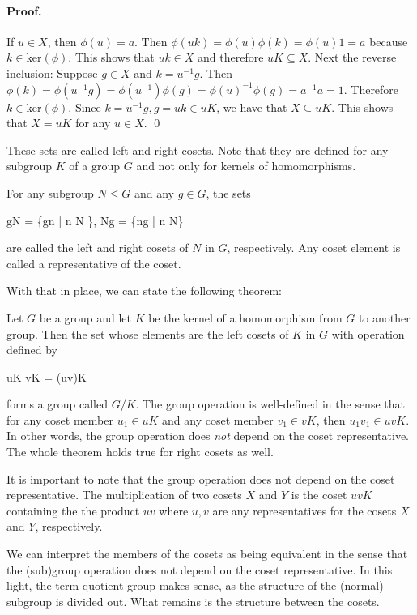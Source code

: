 \paragraph{Proof.} If $u \in X$, then $\phi(u) = a$. Then $\phi(uk) = \phi(u) \phi(k) = \phi(u) 1 = a$ because $k \in \text{ker}(\phi)$. This shows that $uk \in X$ and therefore $uK \subseteq X$. Next the reverse inclusion: Suppose $g \in X$ and $k = u^{-1}g$. Then $\phi(k) = \phi(u^{-1}g) = \phi(u^{-1}) \phi(g) = \phi(u)^{-1} \phi(g) = a^{-1}a = 1$. Therefore $k \in \text{ker}(\phi)$. Since $k=u^{-1}g, g = uk \in uK$, we have that $X \subseteq uK$. This shows that $X = uK$ for any $u \in X$. \qed

These sets are called left and right cosets. Note that they are defined for any subgroup $K$ of a group $G$ and not only for kernels of homomorphisms.

\begin{definition}[Cosets]
For any subgroup $N \leq G$ and any $g \in G$, the sets

\bee
gN = \{gn | n \in N \}, \quad Ng = \{ng | n  \in N\}
\eee

are called the left and right cosets of $N$ in $G$, respectively. Any coset element is called a representative of the coset.
\end{definition}

With that in place, we can state the following theorem: 

\begin{theorem}
Let $G$ be a group and let $K$ be the kernel of a homomorphism from $G$ to another group. Then the set whose elements are the left cosets of $K$ in $G$ with operation defined by

\bee
uK vK = (uv)K
\eee

forms a group called $G/K$. The group operation is well-defined in the sense that for any coset member $u_1 \in uK$ and any coset member $v_1 \in vK$, then $u_1 v_1 \in uvK$. In other words, the group operation does \emph{not} depend on the coset representative. The whole theorem holds true for right cosets as well.
\end{theorem}

It is important to note that the group operation does not depend on the coset representative. The multiplication of two cosets $X$ and $Y$ is the coset $uvK$ containing the the product $uv$ where $u,v$ are any representatives for the cosets $X$ and $Y$, respectively.

We can interpret the members of the cosets as being equivalent in the sense that the (sub)group operation does not depend on the coset representative. In this light, the term quotient group makes sense, as the structure of the (normal) subgroup is divided out. What remains is the structure between the cosets.


